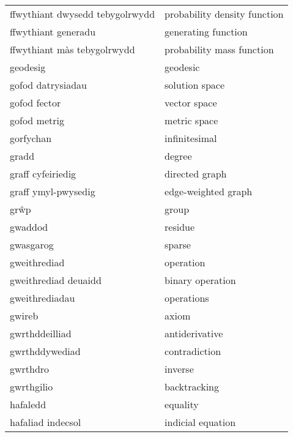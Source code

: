\begin{supertabular}{p{0.22\textwidth}p{0.22\textwidth}}
 ffwythiant dwysedd tebygolrwydd &      probability density function \\
             ffwythiant generadu &               generating function \\
     ffwythiant màs tebygolrwydd &         probability mass function \\
                        geodesig &                          geodesic \\
               gofod datrysiadau &                    solution space \\
                    gofod fector &                      vector space \\
                    gofod metrig &                      metric space \\
                       gorfychan &                     infinitesimal \\
                           gradd &                            degree \\
               graff cyfeiriedig &                    directed graph \\
             graff ymyl-pwysedig &               edge-weighted graph \\
                            grŵp &                             group \\
                         gwaddod &                           residue \\
                       gwasgarog &                            sparse \\
                    gweithrediad &                         operation \\
            gweithrediad deuaidd &                  binary operation \\
                  gweithrediadau &                        operations \\
                          gwireb &                             axiom \\
                  gwrthddeilliad &                    antiderivative \\
                  gwrthddywediad &                     contradiction \\
                        gwrthdro &                           inverse \\
                      gwrthgilio &                      backtracking \\
                        hafaledd &                          equality \\
               hafaliad indecsol &                 indicial equation \\

\end{supertabular}
